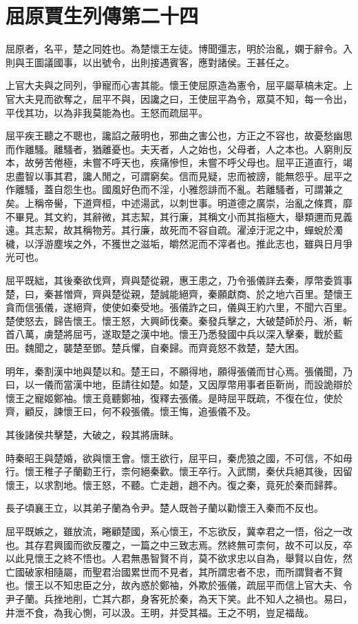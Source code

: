 \chapter{屈原賈生列傳第二十四}

屈原者，名平，楚之同姓也。為楚懷王左徒。博聞彊志，明於治亂，嫻于辭令。入則與王圖議國事，以出號令，出則接遇賓客，應對諸侯。王甚任之。

上官大夫與之同列，爭寵而心害其能。懷王使屈原造為憲令，屈平屬草槁未定。上官大夫見而欲奪之，屈平不與，因讒之曰，王使屈平為令，眾莫不知，每一令出，平伐其功，以為非我莫能為也。王怒而疏屈平。

屈平疾王聽之不聰也，讒諂之蔽明也，邪曲之害公也，方正之不容也，故憂愁幽思而作離騷。離騷者，猶離憂也。夫天者，人之始也，父母者，人之本也。人窮則反本，故勞苦倦極，未嘗不呼天也，疾痛慘怛，未嘗不呼父母也。屈平正道直行，竭忠盡智以事其君，讒人閒之，可謂窮矣。信而見疑，忠而被謗，能無怨乎。屈平之作離騷，蓋自怨生也。國風好色而不淫，小雅怨誹而不亂。若離騷者，可謂兼之矣。上稱帝嚳，下道齊桓，中述湯武，以刺世事。明道德之廣崇，治亂之條貫，靡不畢見。其文約，其辭微，其志絜，其行廉，其稱文小而其指極大，舉類邇而見義遠。其志絜，故其稱物芳。其行廉，故死而不容自疏。濯淖汙泥之中，蟬蛻於濁穢，以浮游塵埃之外，不獲世之滋垢，皭然泥而不滓者也。推此志也，雖與日月爭光可也。

屈平既絀，其後秦欲伐齊，齊與楚從親，惠王患之，乃令張儀詳去秦，厚幣委質事楚，曰，秦甚憎齊，齊與楚從親，楚誠能絕齊，秦願獻商、於之地六百里。楚懷王貪而信張儀，遂絕齊，使使如秦受地。張儀詐之曰，儀與王約六里，不聞六百里。楚使怒去，歸告懷王。懷王怒，大興師伐秦。秦發兵擊之，大破楚師於丹、淅，斬首八萬，虜楚將屈丐，遂取楚之漢中地。懷王乃悉發國中兵以深入擊秦，戰於藍田。魏聞之，襲楚至鄧。楚兵懼，自秦歸。而齊竟怒不救楚，楚大困。

明年，秦割漢中地與楚以和。楚王曰，不願得地，願得張儀而甘心焉。張儀聞，乃曰，以一儀而當漢中地，臣請往如楚。如楚，又因厚幣用事者臣靳尚，而設詭辯於懷王之寵姬鄭袖。懷王竟聽鄭袖，復釋去張儀。是時屈平既疏，不復在位，使於齊，顧反，諫懷王曰，何不殺張儀。懷王悔，追張儀不及。

其後諸侯共擊楚，大破之，殺其將唐眛。

時秦昭王與楚婚，欲與懷王會。懷王欲行，屈平曰，秦虎狼之國，不可信，不如毋行。懷王稚子子蘭勸王行，柰何絕秦歡。懷王卒行。入武關，秦伏兵絕其後，因留懷王，以求割地。懷王怒，不聽。亡走趙，趙不內。復之秦，竟死於秦而歸葬。

長子頃襄王立，以其弟子蘭為令尹。楚人既咎子蘭以勸懷王入秦而不反也。

屈平既嫉之，雖放流，睠顧楚國，系心懷王，不忘欲反，冀幸君之一悟，俗之一改也。其存君興國而欲反覆之，一篇之中三致志焉。然終無可柰何，故不可以反，卒以此見懷王之終不悟也。人君無愚智賢不肖，莫不欲求忠以自為，舉賢以自佐，然亡國破家相隨屬，而聖君治國累世而不見者，其所謂忠者不忠，而所謂賢者不賢也。懷王以不知忠臣之分，故內惑於鄭袖，外欺於張儀，疏屈平而信上官大夫、令尹子蘭。兵挫地削，亡其六郡，身客死於秦，為天下笑。此不知人之禍也。易曰，井泄不食，為我心惻，可以汲。王明，并受其福。王之不明，豈足福哉。

